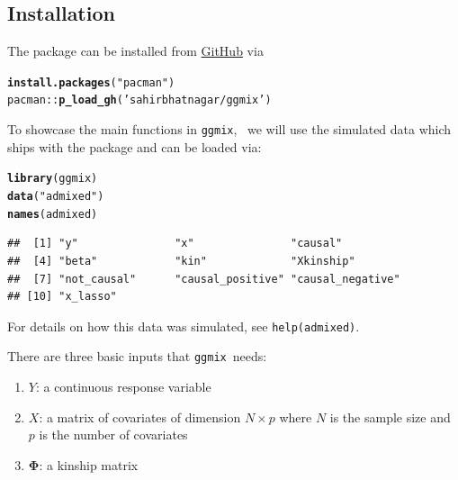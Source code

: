 \documentclass[12pt,letter]{article}\usepackage[]{graphicx}\usepackage[]{color}
\makeatletter
\newcommand{\hlstr}[1]{\textcolor[rgb]{0.192,0.494,0.8}{#1}}%
\newcommand{\hlopt}[1]{\textcolor[rgb]{0,0,0}{#1}}%
\newcommand{\hlstd}[1]{\textcolor[rgb]{0.345,0.345,0.345}{#1}}%
\newcommand{\hlkwd}[1]{\textcolor[rgb]{0.737,0.353,0.396}{\textbf{#1}}}%
\newenvironment{kframe}{%
 \def\at@end@of@kframe{}%
 \ifinner\ifhmode%
  \def\at@end@of@kframe{\end{minipage}}%
  \begin{minipage}{\columnwidth}%
 \fi\fi%
 \def\FrameCommand##1{\hskip\@totalleftmargin \hskip-\fboxsep
 \colorbox{shadecolor}{##1}\hskip-\fboxsep
     \hskip-\linewidth \hskip-\@totalleftmargin \hskip\columnwidth}%
 \MakeFramed {\advance\hsize-\width
   \@totalleftmargin\z@ \linewidth\hsize
   \@setminipage}}%
 {\par\unskip\endMakeFramed%
 \at@end@of@kframe}
\newenvironment{knitrout}{}{} %
\newcommand{\ggmix}{\texttt{ggmix}}
\makeatother
\begin{document}
\subsection{Installation}

The package can be installed from \href{https://github.com/sahirbhatnagar/ggmix}{GitHub} via


\begin{knitrout}\scriptsize
{}\color{fgcolor}\begin{kframe}
\begin{alltt}
\hlkwd{install.packages}\hlstd{(}\hlstr{"pacman"}\hlstd{)}
\hlstd{pacman}\hlopt{::}\hlkwd{p_load_gh}\hlstd{(}\hlstr{'sahirbhatnagar/ggmix'}\hlstd{)}
\end{alltt}
\end{kframe}
\end{knitrout}

To showcase the main functions in \ggmix, ~we will use the simulated data which ships with the package and can be loaded via:

\begin{knitrout}\scriptsize
{}\color{fgcolor}\begin{kframe}
\begin{alltt}
\hlkwd{library}\hlstd{(ggmix)}
\hlkwd{data}\hlstd{(}\hlstr{"admixed"}\hlstd{)}
\hlkwd{names}\hlstd{(admixed)}
\end{alltt}
\begin{verbatim}
##  [1] "y"               "x"               "causal"         
##  [4] "beta"            "kin"             "Xkinship"       
##  [7] "not_causal"      "causal_positive" "causal_negative"
## [10] "x_lasso"
\end{verbatim}
\end{kframe}
\end{knitrout}

For details on how this data was simulated, see \texttt{help(admixed)}.

There are three basic inputs that \ggmix ~needs:
\begin{enumerate}
	\item $Y$: a continuous response variable
\item $X$: a matrix of covariates of dimension $N \times p$ where $N$ is the sample size and $p$ is the number of covariates
\item $\boldsymbol{\Phi}$: a kinship matrix
\end{enumerate}
\end{document}

